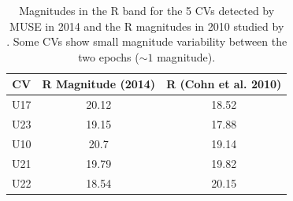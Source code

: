 \begin{table}[h]
\centering
\begin{tabular}{|c|c|c|}
\hline
\textbf{CV} & \textbf{R Magnitude (2014)} & \textbf{R (Cohn et al. 2010)} \\ \hline
U17         & 20.12                       & 18.52                          \\ \hline
U23         & 19.15                       & 17.88                       \\ \hline
U10         & 20.7                        & 19.14                     \\ \hline
U21         & 19.79                       & 19.82                    \\ \hline
U22         & 18.54                       & 20.15                              \\ \hline

\end{tabular}
   \caption{Magnitudes in the R band for the 5 CVs detected by MUSE in 2014 and the R magnitudes in 2010 studied by \cite{cohn_identification_2010}. Some CVs show small magnitude variability between the two epochs ($\sim 1$ magnitude).}
    \label{tab:truthTables}   
\end{table}

